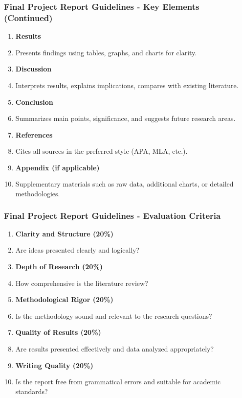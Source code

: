 \documentclass[aspectratio=169]{beamer}
\begin{document}
\begin{frame}[fragile]
    \frametitle{Final Project Report Guidelines - Key Elements (Continued)}
    
    \begin{enumerate}[resume]
        \item \textbf{Results}
            \item Presents findings using tables, graphs, and charts for clarity.
        
        \item \textbf{Discussion}
            \item Interprets results, explains implications, compares with existing literature.
        
        \item \textbf{Conclusion}
            \item Summarizes main points, significance, and suggests future research areas.
        
        \item \textbf{References}
            \item Cites all sources in the preferred style (APA, MLA, etc.).
        
        \item \textbf{Appendix (if applicable)}
            \item Supplementary materials such as raw data, additional charts, or detailed methodologies.
    \end{enumerate}
    
\end{frame}

\begin{frame}[fragile]
    \frametitle{Final Project Report Guidelines - Evaluation Criteria}
    
    \begin{enumerate}
        \item \textbf{Clarity and Structure (20\%)}
            \item Are ideas presented clearly and logically?
        
        \item \textbf{Depth of Research (20\%)}
            \item How comprehensive is the literature review?
        
        \item \textbf{Methodological Rigor (20\%)}
            \item Is the methodology sound and relevant to the research questions?
        
        \item \textbf{Quality of Results (20\%)}
            \item Are results presented effectively and data analyzed appropriately?
        
        \item \textbf{Writing Quality (20\%)}
            \item Is the report free from grammatical errors and suitable for academic standards?
    \end{enumerate}

\end{frame}
\end{document}
